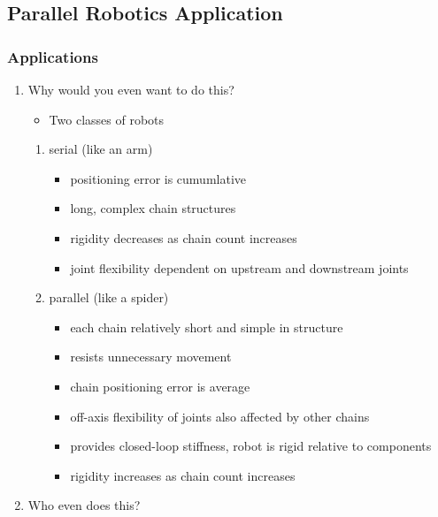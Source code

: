 \documentclass[11pt]{article}
\begin{document}
\subsection{Parallel Robotics Application}
\label{sec:orgd1272f1}
\subsubsection{Applications}
\label{sec:org120ee05}

\begin{enumerate}
\item Why would you even want to do this?
\label{sec:org81c2f1c}

\begin{itemize}
\item Two classes of robots
\end{itemize}

\begin{enumerate}
\item serial (like an arm)
\label{sec:org6a5350e}

\begin{itemize}
\item positioning error is cumumlative
\item long, complex chain structures
\item rigidity decreases as chain count increases
\item joint flexibility dependent on upstream and downstream joints
\end{itemize}

\item parallel (like a spider)
\label{sec:org25cec69}

\begin{itemize}
\item each chain relatively short and simple in structure
\item resists unnecessary movement
\item chain positioning error is average
\item off-axis flexibility of joints also affected by other chains
\item provides closed-loop stiffness, robot is rigid relative to components
\item rigidity increases as chain count increases
\end{itemize}
\end{enumerate}

\item Who even does this?
\label{sec:org130fdb8}


\end{enumerate}
\end{document}
